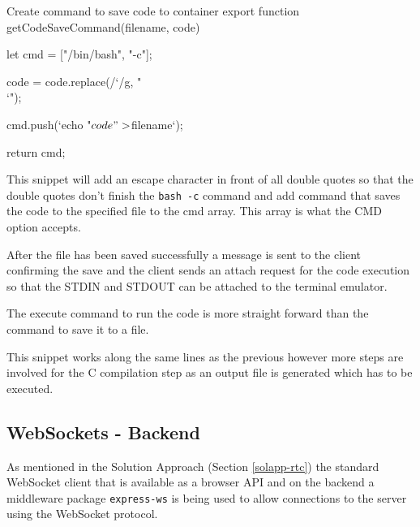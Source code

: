 \begin{sexylisting}{Create command to save code to container}
export function getCodeSaveCommand(filename, code) {
    let cmd = ["/bin/bash", "-c"];

    code = code.replace(/`/g, "\\`");

    cmd.push(`echo "${code}" > ${filename}`);

    return cmd;
}
\end{sexylisting}

This snippet will add an escape character in front of all double quotes so that the double quotes don't finish the \texttt{bash -c} command and add command that saves the code to the specified file to the cmd array. This array is what the CMD option accepts. 

After the file has been saved successfully a message is sent to the client confirming the save and the client sends an attach request for the code execution so that the STDIN and STDOUT can be attached to the terminal emulator.

The execute command to run the code is more straight forward than the command to save it to a file.


This snippet works along the same lines as the previous however more steps are involved for the C compilation step as an output file is generated which has to be executed.

\subsection{WebSockets - Backend}

As mentioned in the Solution Approach (Section \ref{solapp-rtc}) the standard WebSocket client that is available as a browser API and on the backend a middleware package \texttt{express-ws} \cite{expressws} is being used to allow connections to the server using the WebSocket protocol.

